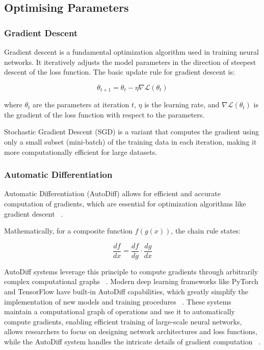 \documentclass[a4paper, oneside]{discothesis}
\begin{document}
\subsection{Optimising Parameters}

\subsubsection{Gradient Descent}

Gradient descent is a fundamental optimization algorithm used in training neural networks. It iteratively adjusts the model parameters in the direction of steepest descent of the loss function. The basic update rule for gradient descent is:

\begin{equation}
    \theta_{t+1} = \theta_t - \eta \nabla \mathcal{L}(\theta_t)
\end{equation}

where $\theta_t$ are the parameters at iteration $t$, $\eta$ is the learning rate, and $\nabla \mathcal{L}(\theta_t)$ is the gradient of the loss function with respect to the parameters.

Stochastic Gradient Descent (SGD) is a variant that computes the gradient using only a small subset (mini-batch) of the training data in each iteration, making it more computationally efficient for large datasets.

\subsubsection{Automatic Differentiation}

Automatic Differentiation (AutoDiff) allows for efficient and accurate computation of gradients, which are essential for optimization algorithms like gradient descent ~\cite{baydin2018automatic}.

Mathematically, for a composite function $f(g(x))$, the chain rule states:

\begin{equation}
    \frac{df}{dx} = \frac{df}{dg} \cdot \frac{dg}{dx}
\end{equation}

AutoDiff systems leverage this principle to compute gradients through arbitrarily complex computational graphs ~\cite{griewank2008evaluating}. Modern deep learning frameworks like PyTorch and TensorFlow have built-in AutoDiff capabilities, which greatly simplify the implementation of new models and training procedures ~\cite{paszke2019pytorch, abadi2016tensorflow}. These systems maintain a computational graph of operations and use it to automatically compute gradients, enabling efficient training of large-scale neural networks, allows researchers to focus on designing network architectures and loss functions, while the AutoDiff system handles the intricate details of gradient computation ~\cite{baydin2018automatic}.
\end{document}
